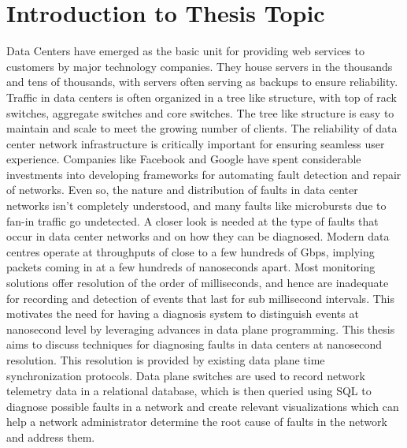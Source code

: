
\chapter{Introduction to Thesis Topic} %

\label{Chapter1} %



Data Centers have emerged as the basic unit for providing web services to customers by major technology companies.
They house servers in the thousands and tens of thousands, with servers often serving as backups to ensure reliability.
Traffic in data centers is often organized in a tree like structure, with top of rack switches, aggregate switches and core
switches. The tree like structure is easy to maintain and scale to meet the growing number of clients.
\newline
The reliability of data center network infrastructure is critically important for ensuring seamless user experience.
Companies like Facebook and Google have spent considerable investments into developing frameworks for
automating fault detection and repair of networks. Even so, the nature and distribution of faults in data center networks
isn't completely understood, and many faults like microbursts due to fan-in traffic go undetected. A closer look is needed at the type of faults
that occur in data center networks and on how they can be diagnosed.
\newline
Modern data centres operate at throughputs of close to a few hundreds of Gbps, implying packets coming in at a few hundreds of nanoseconds
apart. Most monitoring solutions offer resolution of the order of milliseconds, and hence are inadequate
for recording and detection of events that last for sub millisecond intervals. This motivates the need for
having a diagnosis system to distinguish events at nanosecond level by leveraging advances in data plane programming.
\newline
This thesis aims to discuss techniques for diagnosing faults in data centers at nanosecond resolution. This resolution is provided by existing data plane 
time synchronization protocols. Data plane switches are used to record network telemetry data in a relational database, which is then
queried using SQL to diagnose possible faults in a network and create relevant visualizations which can help a network administrator
determine the root cause of faults in the network and address them.

